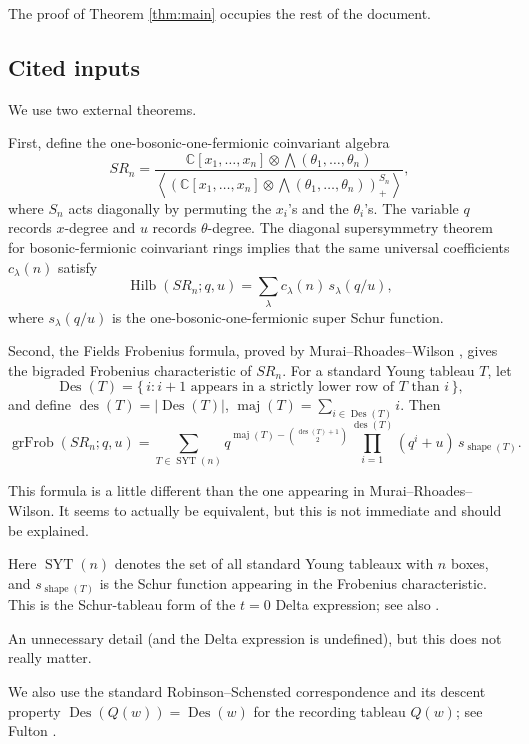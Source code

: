 \documentclass[12pt]{article}
\DeclareMathOperator{\Hilb}{Hilb}
\DeclareMathOperator{\grFrob}{grFrob}
\DeclareMathOperator{\Des}{Des}
\DeclareMathOperator{\des}{des}
\DeclareMathOperator{\maj}{maj}
\DeclareMathOperator{\shape}{shape}
\newcommand{\SYT}{\operatorname{SYT}}
\newcommand{\review}[1]{\begin{reviewbox}#1\end{reviewbox}}
\begin{document}
The proof of Theorem \ref{thm:main} occupies the rest of the document.

\subsection{Cited inputs}

We use two external theorems.

First, define the one-bosonic-one-fermionic coinvariant algebra
\[
SR_n
=
\frac{\mathbb C[x_1,\ldots,x_n]\otimes \bigwedge(\theta_1,\ldots,\theta_n)}
{\left\langle
\left(\mathbb C[x_1,\ldots,x_n]\otimes \bigwedge(\theta_1,\ldots,\theta_n)\right)^{S_n}_{+}
\right\rangle},
\]
where \(S_n\) acts diagonally by permuting the \(x_i\)'s and the \(\theta_i\)'s.  The variable \(q\) records \(x\)-degree and \(u\) records \(\theta\)-degree.  The diagonal supersymmetry theorem for bosonic-fermionic coinvariant rings \cite{Lentfer2025} implies that the same universal coefficients \(c_\lambda(n)\) satisfy
\begin{equation}\label{eq:diagonal-supersymmetry}
\Hilb(SR_n;q,u)
=
\sum_\lambda c_\lambda(n)\,s_\lambda(q/u),
\end{equation}
where \(s_\lambda(q/u)\) is the one-bosonic-one-fermionic super Schur function.

Second, the Fields Frobenius formula, proved by Murai--Rhoades--Wilson \cite{MRW2025}, gives the bigraded Frobenius characteristic of \(SR_n\).  For a standard Young tableau \(T\), let
\[
\Des(T)=\{\,i: i+1 \text{ appears in a strictly lower row of }T\text{ than }i\,\},
\]
and define \(\des(T)=|\Des(T)|\), \(\maj(T)=\sum_{i\in\Des(T)}i\).  Then
\begin{equation}\label{eq:fields}
\grFrob(SR_n;q,u)
=
\sum_{T\in \SYT(n)}
q^{\maj(T)-\binom{\des(T)+1}{2}}
\prod_{i=1}^{\des(T)}(q^i+u)\,
s_{\shape(T)}.
\end{equation}
\review{This formula is a little different than the one appearing in  Murai--Rhoades--Wilson. It seems to actually be equivalent, but this is not immediate and should be explained. }
Here \(\SYT(n)\) denotes the set of all standard Young tableaux with \(n\) boxes, and \(s_{\shape(T)}\) is the Schur function appearing in the Frobenius characteristic.  This is the Schur-tableau form of the \(t=0\) Delta expression; see also \cite{HRS2019}. \review{An unnecessary detail (and the Delta expression is undefined), but this does not really matter. } We also use the standard Robinson--Schensted correspondence and its descent property \(\Des(Q(w))=\Des(w)\) for the recording tableau \(Q(w)\); see Fulton \cite{Fulton1997}.
\end{document}
